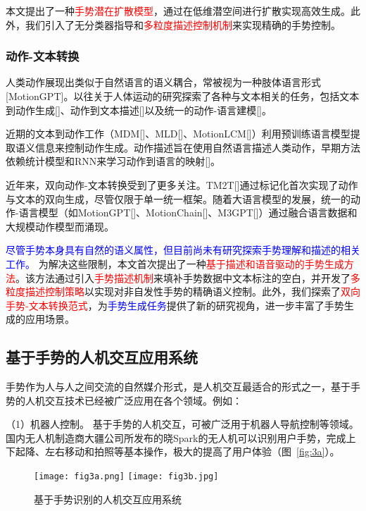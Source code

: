 本文提出了一种\textcolor{red}{手势潜在扩散模型}，通过在低维潜空间进行扩散实现高效生成。此外，我们引入了无分类器指导和\textcolor{red}{多粒度描述控制机制}来实现精确的手势控制。

\subsubsection{动作-文本转换}
人类动作展现出类似于自然语言的语义耦合，常被视为一种肢体语言形式[MotionGPT]。以往关于人体运动的研究探索了各种与文本相关的任务，包括文本到动作生成[]、动作到文本描述[]以及统一的动作-语言建模[]。

近期的文本到动作工作（MDM[]、MLD[]、MotionLCM[]）利用预训练语言模型提取语义信息来控制动作生成。动作描述旨在使用自然语言描述人类动作，早期方法依赖统计模型和RNN来学习动作到语言的映射[]。

近年来，双向动作-文本转换受到了更多关注。TM2T[]通过标记化首次实现了动作与文本的双向生成，尽管仅限于单一统一框架。随着大语言模型的发展，统一的动作-语言模型（如MotionGPT[]、MotionChain[]、M3GPT[]）通过融合语言数据和大规模动作模型而涌现。

\textcolor{blue}{尽管手势本身具有自然的语义属性，但目前尚未有研究探索手势理解和描述的相关工作。}
为解决这些限制，本文首次提出了一种\textcolor{red}{基于描述和语音驱动的手势生成方法}。该方法通过引入\textcolor{red}{手势描述机制}来填补手势数据中文本标注的空白，并开发了\textcolor{red}{多粒度描述控制策略}以实现对非自发性手势的精确语义控制。此外，我们探索了\textcolor{red}{双向手势-文本转换范式}，为\textcolor{blue}{手势生成任务}提供了新的研究视角，进一步丰富了手势生成的应用场景。



\subsection{基于手势的人机交互应用系统}
手势作为人与人之间交流的自然媒介形式，是人机交互最适合的形式之一\cite{oudah2020hand}，基于手势的人机交互技术已经被广泛应用在各个领域。例如：

（1）机器人控制。 基于手势的人机交互，可被广泛用于机器人导航控制等领域\cite{al20223d}。国内无人机制造商大疆公司所发布的晓Spark的无人机可以识别用户手势，完成上下起降、左右移动和拍照等基本操作，极大的提高了用户体验（图~\ref{fig:3a}）。

\begin{figure}
  \centering
    {\texttt{[image: fig3a.png]}}
    {\texttt{[image: fig3b.jpg]}}
  \caption{基于手势识别的人机交互应用系统}
  \label{fig:HCI_system}
\end{figure}


